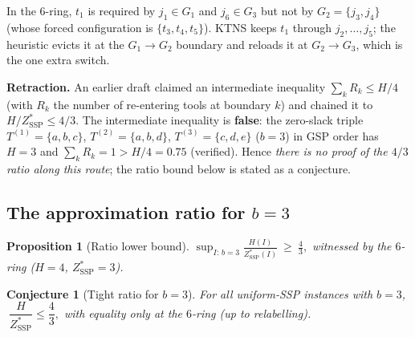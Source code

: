 \documentclass[11pt,a4paper]{article}
\theoremstyle{plain}
\newtheorem{proposition}[theorem]{Proposition}
\newtheorem{conjecture}[theorem]{Conjecture}
\theoremstyle{definition}
\newcommand{\ZSSP}{Z_{\mathrm{SSP}}^{*}}
\begin{document}
In the $6$-ring, $t_1$ is required by $j_1\in G_1$ and $j_6\in G_3$ but not by
$G_2=\{j_3,j_4\}$ (whose forced configuration is $\{t_3,t_4,t_5\}$). KTNS keeps $t_1$
through $j_2,\dots,j_5$; the heuristic evicts it at the $G_1\!\to\!G_2$ boundary and
reloads it at $G_2\!\to\!G_3$, which is the one extra switch.

\begin{warnbox}
\textbf{Retraction.}\label{rem:retract}
An earlier draft claimed an intermediate inequality $\sum_kR_k\le H/4$ (with $R_k$ the
number of re-entering tools at boundary $k$) and chained it to $H/\ZSSP\le 4/3$. The
intermediate inequality is \textbf{false}: the zero-slack triple
$T^{(1)}=\{a,b,c\}$, $T^{(2)}=\{a,b,d\}$, $T^{(3)}=\{c,d,e\}$ ($b=3$) in GSP order has
$H=3$ and $\sum_kR_k=1>H/4=0.75$ (verified). Hence \emph{there is no proof of the $4/3$
ratio along this route}; the ratio bound below is stated as a conjecture.
\end{warnbox}

\subsection{The approximation ratio for $b=3$}

\begin{thmbox}
\begin{proposition}[Ratio lower bound]
\label{prop:ratio_lb}
$\displaystyle \sup_{I:\,b=3}\frac{H(I)}{\ZSSP(I)}\ \ge\ \frac43,$
witnessed by the $6$-ring ($H=4$, $\ZSSP=3$).
\end{proposition}
\end{thmbox}

\begin{thmbox}
\begin{conjecture}[Tight ratio for $b=3$]
\label{conj:ratio}
For all uniform-SSP instances with $b=3$, $\ \dfrac{H}{\ZSSP}\le\dfrac43,$ with equality
only at the $6$-ring (up to relabelling).
\end{conjecture}
\end{thmbox}
\end{document}
